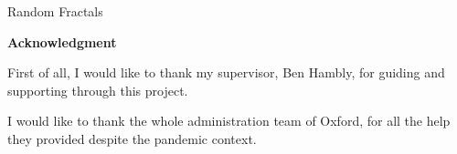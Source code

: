 \documentclass[a4paper, 11pt]{article}
\begin{document}
	
	\begin{center}
		\LARGE Random Fractals
	\end{center}
	\vspace{0.5cm}
	\begin{abstract}
		[blah]
	\end{abstract}
	

	\vspace{2.5cm}
	\begin{center}
		\textbf{Acknowledgment}
	\end{center}
	\vspace{1cm}
	
	First of all, I would like to thank my supervisor, Ben Hambly, for guiding and supporting through this project.
		
	I would like to thank the whole administration team of Oxford, for all the help they provided despite the pandemic context.	
	
	
	\newpage
	
	\tableofcontents
	
	
	
	
	
	
	
	\appendix
	
	
	
	
	
\end{document}
